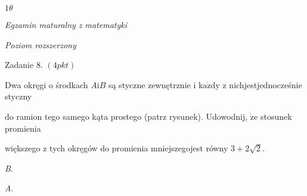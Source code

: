 \documentclass[a4paper,12pt]{article}
\begin{document}
$ 1\theta$

{\it Egzamin maturalny z matematyki}

{\it Poziom rozszerzony}

Zadanie 8. $(4pkt)$

Dwa okręgi o środkach $A\mathrm{i}B$ są styczne zewnętrznie i $\mathrm{k}\mathrm{a}\dot{\mathrm{z}}\mathrm{d}\mathrm{y}$ z nichjestjednocześnie styczny

do ramion tego samego kąta prostego (patrz rysunek). Udowodnij, $\dot{\mathrm{z}}\mathrm{e}$ stosunek promienia

większego z tych okręgów do promienia mniejszegojest równy $3+2\sqrt{2}.$

{\it B}.

{\it A}.
\end{document}
